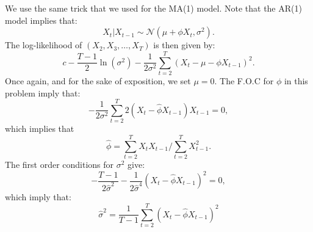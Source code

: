 \documentclass[12] {article}
\begin{document}
We use the same trick that we used for the MA(1) model. Note that the AR(1) model implies that:
$$  X_t | X_{t-1} \sim \mathcal{N}( \mu + \phi X_t , \sigma^2 ).$$
The log-likelihood of $(X_2, X_3, \ldots, X_T)$ is then given by:
$$ c - \frac{T-1}{2} \ln (\sigma^2) - \frac{1}{2 \sigma^2} \sum_{t=2}^{T} (X_t - \mu - \phi X_{t-1})^2.$$
Once again, and for the sake of exposition, we set $\mu=0$. The F.O.C for $\phi$ in this problem imply that:
$$ -\frac{1}{2 \sigma^2} \sum_{t=2}^{T} 2(X_t - \widehat{\phi} X_{t-1}) X_{t-1} = 0, $$
which implies that
$$ \widehat{\phi} = \sum_{t=2}^{T} X_{t}X_{t-1} / \sum_{t=2}^{T} X_{t-1}^2.  $$             
The first order conditions for $\sigma^2$ give:
$$ -\frac{T-1}{2 \widehat{\sigma}^2} - \frac{1}{2 \widehat{\sigma}^4}(X_t - \widehat{\phi} X_{t-1})^2 = 0,$$
which imply that:
$$ \widehat{\sigma}^2 = \frac{1}{T-1} \sum_{t=2}^{T} (X_t - \widehat{\phi} X_{t-1})^2  $$
\end{document}
